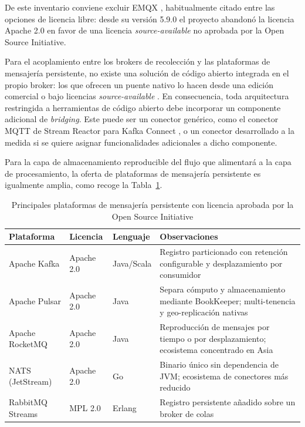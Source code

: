 De este inventario conviene excluir EMQX \cite{emqx2026}, habitualmente citado entre las opciones de licencia libre: desde su versión 5.9.0 el proyecto abandonó la licencia Apache 2.0 en favor de una licencia \textit{source-available} no aprobada por la Open Source Initiative.

Para el acoplamiento entre los brokers de recolección y las plataformas de mensajería persistente, no existe una solución de código abierto integrada en el propio broker: los que ofrecen un puente nativo lo hacen desde una edición comercial \cite{hivemq2026} o bajo licencias \textit{source-available} \cite{emqx2026}. En consecuencia, toda arquitectura restringida a herramientas de código abierto debe incorporar un componente adicional de \textit{bridging}. Este puede ser un conector genérico, como el conector MQTT de Stream Reactor para Kafka Connect \cite{lensesio2026}, o un conector desarrollado a la medida si se quiere asignar funcionalidades adicionales a dicho componente.

Para la capa de almacenamiento reproducible del flujo que alimentará a la capa de procesamiento, la oferta de plataformas de mensajería persistente es igualmente amplia, como recoge la Tabla~\ref{tab:log-distribuido}.

\begin{table}[ht!]
  \centering
  \small
  \begin{tabular}{|l|l|l|p{5.6cm}|}
    \hline
    \textbf{Plataforma} & \textbf{Licencia} & \textbf{Lenguaje} & \textbf{Observaciones} \\ \hline
    Apache Kafka & Apache 2.0 & Java/Scala & Registro particionado con retención configurable y desplazamiento por consumidor \\ \hline
    Apache Pulsar & Apache 2.0 & Java & Separa cómputo y almacenamiento mediante BookKeeper; multi-tenencia y geo-replicación nativas \\ \hline
    Apache RocketMQ & Apache 2.0 & Java & Reproducción de mensajes por tiempo o por desplazamiento; ecosistema concentrado en Asia \\ \hline
    NATS (JetStream) & Apache 2.0 & Go & Binario único sin dependencia de JVM; ecosistema de conectores más reducido \\ \hline
    RabbitMQ Streams & MPL 2.0 & Erlang & Registro persistente añadido sobre un broker de colas \\ \hline
  \end{tabular}
  \caption{Principales plataformas de mensajería persistente con licencia aprobada por la Open Source Initiative}
  \label{tab:log-distribuido}
\end{table}

